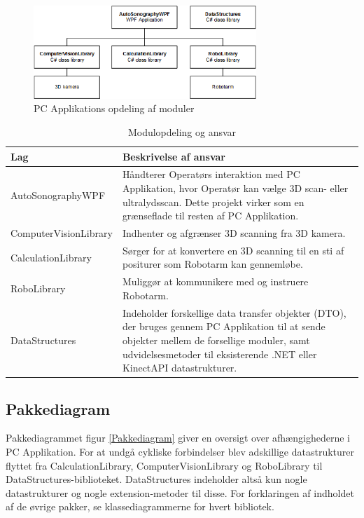 \begin{figure}[H]
    \centering
    \includegraphics[width=0.75\textwidth]{figurer/d/Design/Layers}
    \caption{PC Applikations opdeling af moduler}
    \label{Layers}
\end{figure}


\begin{table}[htb]
\begin{tabular}{ | l | p{} | }
\hline
\textbf{Lag} & \textbf{Beskrivelse af ansvar} \\\hline
AutoSonographyWPF & Håndterer Operatørs interaktion med PC Applikation, hvor Operatør kan vælge 3D scan- eller ultralydsscan. Dette projekt virker som en grænseflade til resten af PC Applikation.\\\hline
ComputerVisionLibrary & Indhenter og afgrænser 3D scanning fra 3D kamera. \\\hline
CalculationLibrary & Sørger for at konvertere en 3D scanning til en sti af positurer som Robotarm kan gennemløbe. \\\hline
RoboLibrary & Muliggør at kommunikere med og instruere Robotarm.\\\hline
DataStructures & Indeholder forskellige data transfer objekter (DTO), der bruges gennem PC Applikation til at sende objekter mellem de forsellige moduler, samt udvidelsesmetoder til eksisterende .NET eller KinectAPI datastrukturer.\\\hline
\end{tabular}
\caption{Modulopdeling og ansvar}
\end{table}

\newpage
\subsection{Pakkediagram}
Pakkediagrammet figur \ref{Pakkediagram} giver en oversigt over afhængighederne i PC Applikation.
For at undgå cykliske forbindelser blev adskillige datastrukturer flyttet fra CalculationLibrary, ComputerVisionLibrary og RoboLibrary til DataStructures-biblioteket.
DataStructures indeholder altså kun nogle datastrukturer og nogle extension-metoder til disse. 
For forklaringen af indholdet af de øvrige pakker, se klassediagrammerne for hvert bibliotek.

